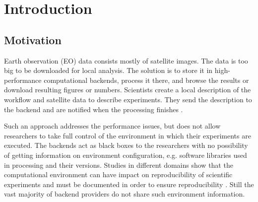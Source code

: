 \documentclass[draft,final]{vutinfth} %
\begin{document}

\tableofcontents %

\mainmatter

\chapter{Introduction}\label{Introduction}

\section{Motivation}\label{Motivation}

Earth observation (EO) data consists mostly of satellite images. The data is too big to be downloaded for local analysis. The solution is to store it in high-performance computational backends, process it there, and browse the results or download resulting figures or numbers. Scientists create a local description of the workflow and satellite data to describe experiments. They send the description to the backend and are notified when the processing finishes \cite{geocloud}.  

Such an approach addresses the performance issues, but does not allow researchers to take full control of the environment in which their experiments are executed. The backends act as black boxes to the researchers with no possibility of getting information on environment configuration, e.g. software libraries used in processing and their versions. Studies in different domains show that the computational environment can have impact on reproducibility of scientific experiments and must be documented in order to ensure reproducibility \cite{Freesurfer} \cite{Thestateofreproducibility}  \cite{MiksaBiomedical}. Still the vast majority of backend providers do not share such environment information. 
\end{document}
